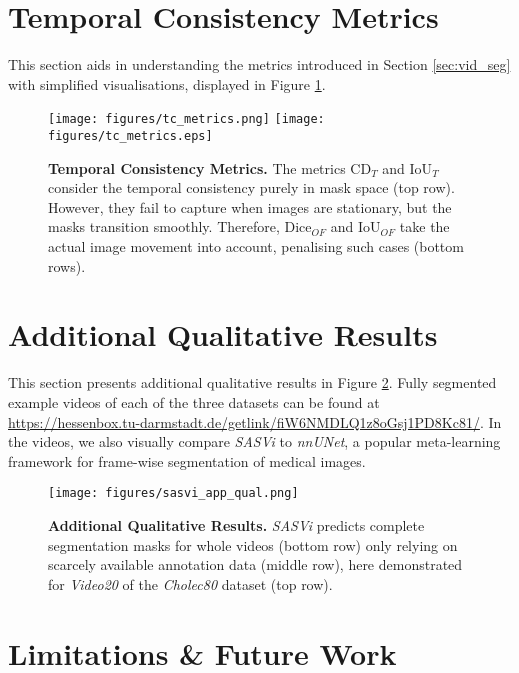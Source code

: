 \section{Temporal Consistency Metrics}
\label{sec:app_temp}

This section aids in understanding the metrics introduced in Section \ref{sec:vid_seg} with simplified visualisations, displayed in Figure \ref{fig:app_tc}.

\begin{figure}[htbp]
    \centering
    \if{}
        \texttt{[image: figures/tc\_metrics.png]}
    \else
        \texttt{[image: figures/tc\_metrics.eps]}
    \fi
    \caption{\textbf{Temporal Consistency Metrics.} The metrics $\text{CD}_{T}$ and $\text{IoU}_{T}$ consider the temporal consistency purely in mask space (top row). However, they fail to capture when images are stationary, but the masks transition smoothly.
    Therefore, $\text{Dice}_{OF}$ and $\text{IoU}_{OF}$ take the actual image movement into account, penalising such cases (bottom rows).}
    \label{fig:app_tc}
\end{figure}

\section{Additional Qualitative Results}
\label{sec:app_qual}

This section presents additional qualitative results in Figure \ref{fig:app_qual}. Fully segmented example videos of each of the three datasets can be found at \href{https://hessenbox.tu-darmstadt.de/getlink/fiW6NMDLQ1z8oGsj1PD8Kc81/}{https://hessenbox.tu-darmstadt.de/getlink/fiW6NMDLQ1z8oGsj1PD8Kc81/}. In the videos, we also visually compare \emph{SASVi} to \emph{nnUNet}, a popular meta-learning framework for frame-wise segmentation of medical images.

\begin{figure}[htbp]
    \centering
    \texttt{[image: figures/sasvi\_app\_qual.png]}
    \caption{\textbf{Additional Qualitative Results.} \emph{SASVi} predicts complete segmentation masks for whole videos (bottom row) only relying on scarcely available annotation data (middle row), here demonstrated for \emph{Video20} of the \emph{Cholec80} dataset (top row).}
    \label{fig:app_qual}
\end{figure}

\section{Limitations \& Future Work}
\label{sec:app_limit}

